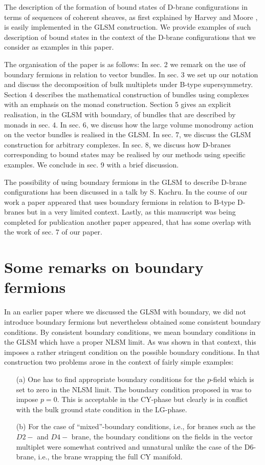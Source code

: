 \documentclass[a4paper,12pt]{article}
\begin{document}
The description of the formation of bound states of D-brane
configurations in terms of sequences of coherent sheaves, 
as first explained by Harvey and Moore \cite{bpsalgebra}, is easily  
implemented in the GLSM construction. We provide examples of such
description of bound states in the context of the D-brane configurations  
that we consider as examples in this paper.


The organisation of the paper is as follows: In sec. 2 we remark on the
use of boundary fermions in relation to vector bundles. In sec. 3  we
set up our notation and discuss the decomposition of bulk multiplets
under B-type supersymmetry.  Section 4 describes the mathematical
construction of bundles using complexes with an emphasis on the monad
construction. Section 5 gives an explicit realisation, in the GLSM with
boundary, of bundles that
are described by monads in sec. 4. In sec. 6, we discuss how the large
volume monodromy action on the vector bundles is realised in the GLSM.
In sec. 7, we discuss the GLSM construction for arbitrary complexes.
In sec. 8, we discuss how D-branes corresponding to bound states
may be realised by our methods using specific examples. We conclude
in sec. 9 with a brief discussion. 

The possibility of using boundary fermions in the GLSM to describe D-brane
configurations has been discussed in a talk by S.
Kachru\cite{stringstalk}. In the course of our work a paper
appeared \cite{hori} that uses boundary fermions in relation 
to B-type D-branes but in a very limited context. Lastly, as this
manuscript was being completed for publication another paper \cite{mcg}
appeared, that has some overlap with the work of sec. 7 of our paper. 

\section{Some remarks on boundary fermions}

In an earlier paper\cite{lsmone}
 where we discussed the GLSM with boundary, we did not
introduce boundary fermions but nevertheless obtained some consistent
boundary conditions. By consistent boundary conditions, we mean boundary
conditions in the GLSM which have a proper NLSM limit. As was shown in
that context, this imposes a rather stringent condition on the possible
boundary conditions. In that construction two problems arose in the
context of fairly simple examples:
\begin{enumerate}
\item[(a)] One has to find appropriate boundary conditions for the
$p$-field which is set to zero in the NLSM limit. The boundary
condition proposed in \cite{lsmone}
was to impose $p=0$. This is acceptable in the CY-phase but clearly
is in conflict with the bulk ground state condition in the LG-phase.
\item[(b)] For the case of ``mixed''-boundary conditions, i.e., for
branes such as the $D2-$ and $D4-$ brane, the boundary conditions on the
fields in the vector multiplet were somewhat contrived and unnatural
unlike the case of the D6-brane, i.e., the brane wrapping the full CY
manifold.
\end{enumerate}
\end{document}
